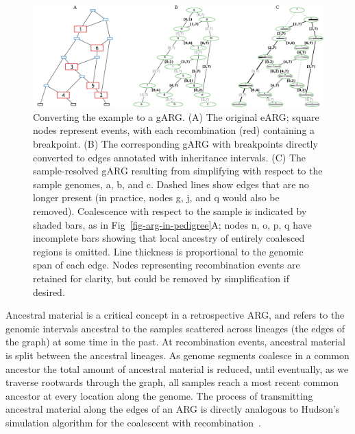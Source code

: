 \documentclass{article}
\newcommand{\noderef}[1]{\textsf{#1}}
\begin{document}
\begin{figure}
\centering
\includegraphics[width=\textwidth]{illustrations/ancestry-resolution}
\caption{\label{fig-ancestry-resolution}
Converting the \citet[][Fig.~1]{wiuf1999recombination} example
to a gARG. (A) The original eARG; square nodes represent events, with
each recombination (red) containing a breakpoint.
(B) The corresponding gARG with breakpoints directly converted to
edges annotated with inheritance intervals.
(C) The sample-resolved gARG resulting from simplifying with respect
to the sample genomes, \noderef{a}, \noderef{b}, and \noderef{c}.
Dashed lines show edges that are
no longer present (in practice, nodes \noderef{g}, \noderef{j}, and \noderef{q} would also be removed).
Coalescence with respect to the sample is indicated by shaded bars, as
in Fig~\ref{fig-arg-in-pedigree}A; nodes \noderef{n}, \noderef{o}, \noderef{p}, \noderef{q} have incomplete
bars showing that local ancestry of entirely coalesced regions is omitted.
Line thickness is proportional to the genomic span of each edge.
Nodes representing recombination events are retained
for clarity, but could be removed by simplification if
desired.
}
\end{figure}

Ancestral material is a critical concept in a retrospective ARG,
and refers to the genomic intervals ancestral to the samples
scattered across lineages (the edges of the graph)
at some time in the past. At recombination
events, ancestral material is split between the ancestral lineages.
As genome segments coalesce in a common
ancestor the total amount of ancestral material is reduced, until
eventually, as we traverse rootwards through the graph, all
samples reach a most recent common ancestor at every location
along the genome. The process of transmitting ancestral material
along the edges of an ARG is directly analogous to Hudson's
simulation algorithm for the coalescent with
recombination~\citep{hudson1983testing,kelleher2016efficient}.
\end{document}
